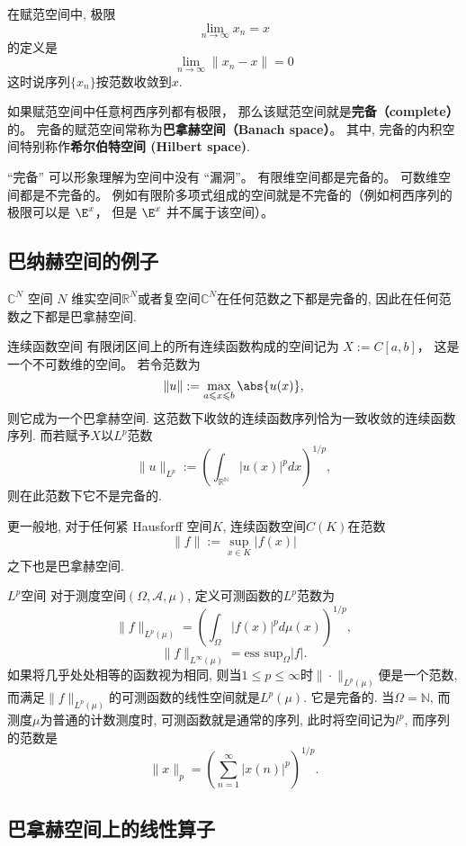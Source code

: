 
在赋范空间中, 极限
\begin{equation}
\lim_{n\to\infty} x_n = x
\end{equation}
的定义是
\begin{equation}
\lim_{n\to\infty} \|{x_n - x}\|= 0
\end{equation}
这时说序列$\{x_n\}$按范数收敛到$x$.

如果赋范空间中任意柯西序列都有极限， 那么该赋范空间就是\textbf{完备（complete）}的。 完备的赋范空间常称为\textbf{巴拿赫空间（Banach space）}。 其中, 完备的内积空间特别称作\textbf{希尔伯特空间 (Hilbert space)}.

“完备” 可以形象理解为空间中没有 “漏洞”。 有限维空间都是完备的。 可数维空间都是不完备的。 例如有限阶多项式组成的空间就是不完备的（例如柯西序列的极限可以是 $\E^x$， 但是 $\E^x$ 并不属于该空间）。

\subsection{巴纳赫空间的例子}
\begin{example}{$\mathbb C^N$ 空间}
$N$ 维实空间$\mathbb R^N$或者复空间$\mathbb C^N$在任何范数之下都是完备的, 因此在任何范数之下都是巴拿赫空间.
\end{example}

\begin{example}{连续函数空间}
有限闭区间上的所有连续函数构成的空间记为 $X := C[a, b]$， 这是一个不可数维的空间。 若令范数为
$$
\|{u}\|:= \max_{a \leqslant x \leqslant b} \abs{u(x)},
$$
则它成为一个巴拿赫空间. 这范数下收敛的连续函数序列恰为一致收敛的连续函数序列. 而若赋予$X$以$L^p$范数
$$
\|u\|_{L^p}:=\left(\int_{\mathbb{R^N}}|u(x)|^pdx\right)^{1/p},
$$
则在此范数下它不是完备的.

更一般地, 对于任何紧 Hausforff 空间$K$, 连续函数空间$C(K)$在范数
$$
\|f\|:=\sup_{x\in K}|f(x)|
$$
之下也是巴拿赫空间.
\end{example}

\begin{example}{$L^p$空间}
对于测度空间$(\Omega,\mathcal{A},\mu)$, 定义可测函数的$L^p$范数为
$$
\|f\|_{L^p(\mu)}=\left(\int_\Omega |f(x)|^pd\mu(x)\right)^{1/p},
$$
$$
\|f\|_{L^\infty(\mu)}=\text{ess sup}_{\Omega}|f|.
$$
如果将几乎处处相等的函数视为相同, 则当$1\leq p\leq\infty$时$\|\cdot\|_{L^p(\mu)}$便是一个范数, 而满足$\|f\|_{L^p(\mu)}$的可测函数的线性空间就是$L^p(\mu)$. 它是完备的. 当$\Omega=\mathbb{N}$, 而测度$\mu$为普通的计数测度时, 可测函数就是通常的序列, 此时将空间记为$l^p$, 而序列的范数是
$$
\|x\|_p=\left(\sum_{n=1}^\infty|x(n)|^p\right)^{1/p}.
$$

\subsection{巴拿赫空间上的线性算子}


\end{example}